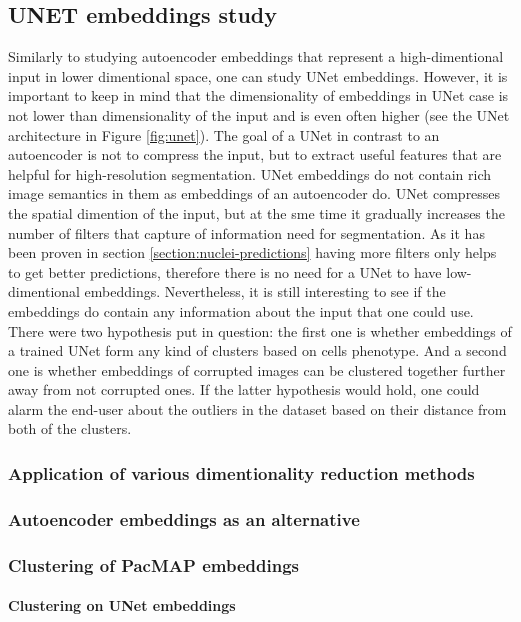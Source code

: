 \subsection{UNET embeddings study}
    Similarly to studying autoencoder embeddings that represent a high-dimentional input in lower dimentional space, one can study UNet embeddings. However, it is important to keep in mind that the dimensionality of embeddings in UNet case is not lower than dimensionality of the input and is even often higher (see the UNet architecture in Figure \ref{fig:unet}). The goal of a UNet in contrast to an autoencoder is not to compress the input, but to extract useful features that are helpful for high-resolution segmentation. UNet embeddings do not contain rich image semantics in them as embeddings of an autoencoder do. UNet compresses the spatial dimention of the input, but at the sme time it gradually increases the number of filters that capture of information need for segmentation. As it has been proven in section \ref{section:nuclei-predictions} having more filters only helps to get better predictions, therefore there is no need for a UNet to have low-dimentional embeddings. Nevertheless, it is still interesting to see if the embeddings do contain any information about the input that one could use. There were two hypothesis put in question: the first one is whether embeddings of a trained UNet form any kind of clusters based on cells phenotype. And a second one is whether embeddings of corrupted images can be clustered together further away from not corrupted ones. If the latter hypothesis would hold, one could alarm the end-user about the outliers in the dataset based on their distance from both of the clusters. 
    \subsubsection{Application of various dimentionality reduction methods}
        \label{section:unet-embeddings-dim-reduction}
        
    \subsubsection{Autoencoder embeddings as an alternative}
        
    \subsubsection{Clustering of PacMAP embeddings}
        \paragraph{Clustering on UNet embeddings}
        \label{section:clustering-on-unet-embeddings}
        
